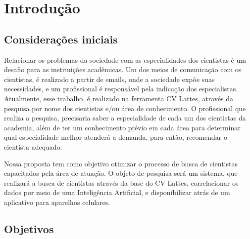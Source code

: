 \chapter{Introdução}\label{cap:introducao}


\section{Considerações iniciais}\label{sec:consideracoesIniciais}


Relacionar os problemas da sociedade com as especialidades dos cientistas é um desafio para as instituições acadêmicas. 
Um dos meios de comunicação com os cientistas, é realizado a partir de emails, onde a sociedade expõe suas necessidades, 
e um profissional é responsável pela indicação dos especialistas. Atualmente, esse trabalho, é realizado 
na ferramenta CV Lattes, através da pesquisa por nome dos cientistas e/ou área de conhecimento. O profissional 
que realiza a pesquisa, precisaria saber a especialidade de cada um dos cientistas da academia, além de ter um conhecimento prévio 
em cada área para determinar qual especialidade melhor atenderá a demanda, para então, recomendar o cientista adequado.

Nossa proposta tem como objetivo otimizar o processo de busca de cientistas capacitados pela área de atuação. O objeto de pesquisa 
será um sistema, que realizará a busca de cientistas através da base do CV Lattes, correlacionar os dados por meio de uma Inteligência 
Artificial, e disponíbilizar atrás de um aplicativo para aparelhos celulares.

\section{Objetivos}\label{sec:objetivos}

